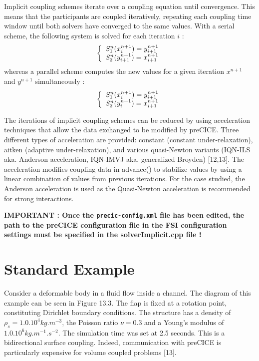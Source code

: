 \documentclass[oneside,11pt,times]{book}
\begin{document}
Implicit coupling schemes iterate over a coupling equation until convergence. This means that the participants are coupled iteratively, repeating each coupling time window until both solvers have converged to the same values. With a serial scheme, the following system is solved for each iteration $i$ :
\begin{equation}
    \left\{
        \begin{array}{r c l}
        S_1^n(x^{n+1}_i) = y^{n+1}_{i+1}\\
        S_2^n(y^{n+1}_{i+1}) = x^{n+1}_{i+1}
        \end{array}
        \right.
\end{equation}
whereas a parallel scheme computes the new values for a given iteration $x^{n+1}$ and $y^{n+1}$ simultaneously :
\begin{equation}
    \left\{
        \begin{array}{r c l}
        S_1^n(x^{n+1}_i) = y^{n+1}_{i+1}\\
        S_2^n(y^{n+1}_{i}) = x^{n+1}_{i+1}
        \end{array}
        \right.
\end{equation}

The iterations of implicit coupling schemes can be reduced by using acceleration techniques that allow the data exchanged to be modified by preCICE. Three different types of acceleration are provided: constant (constant under-relaxation), aitken (adaptive under-relaxation), and various quasi-Newton variants (IQN-ILS aka. Anderson acceleration, IQN-IMVJ aka. generalized Broyden) [12,13]. The acceleration modifies coupling data in advance() to stabilize values by using a linear combination of values from previous iterations. For the case studied, the Anderson acceleration is used as the Quasi-Newton acceleration is recommended for strong interactions.

\textbf{IMPORTANT : Once the \texttt{precic-config.xml} file has been edited, the path to the preCICE configuration file in the FSI configuration settings must be specified in the \textbf{solverImplicit.cpp} file !}

\section{Standard Example}


Consider a deformable body in a fluid flow inside a channel. The diagram of this example can be seen in Figure 13.3. The flap is fixed at a rotation point, constituting Dirichlet boundary conditions. The structure has a density of $\rho_s = 1.0.10^4 kg.m^{-3}$, the Poisson ratio $\nu = 0.3$ and a Young's modulus of $1.0.10^6 kg.m^{-1}.s^{-2}$. The simulation time was set at 2.5 seconds.  This is a bidirectional surface coupling. Indeed, communication with preCICE is particularly expensive for volume coupled problems [13].\\
\end{document}
